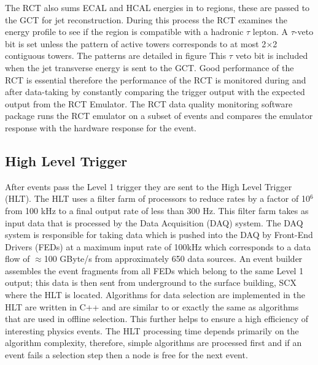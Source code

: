 The RCT also sums ECAL and HCAL energies in to regions, these are passed
to the GCT for jet reconstruction. During this process the RCT examines the
energy profile to see if the region is compatible with a hadronic $\tau$ lepton.
A $\tau$-veto bit is set unless the pattern of active towers corresponds to at
most 2$\times$2 contiguous towers. The patterns are detailed in figure %
This $\tau$ veto bit is included when the jet transverse energy is sent to the GCT.
Good performance of the RCT is essential therefore the performance of the RCT%
is monitored during and after data-taking by constantly comparing the trigger 
output with the expected output from the RCT Emulator. The RCT data quality monitoring 
software package runs the RCT emulator on a subset of events and compares
the emulator response with the hardware response for the event.

  \subsection{High Level Trigger}
After events pass the Level 1 trigger they are sent to the High Level Trigger (HLT). The
HLT uses a filter farm of processors to reduce rates by a factor of 10$^{6}$ from 
100 kHz to a final output rate of less than 300 Hz. This filter farm takes as input
data that is processed by the Data Acquisition (DAQ) system. The DAQ system is responsible
for taking data which is pushed into the DAQ by Front-End Drivers (FEDs) at a maximum input 
rate of 100kHz which corresponds to a data flow of $\approx$100 GByte/s from approximately
650 data sources. An event builder assembles the event fragments from all FEDs
which belong to the same Level 1 output; this data is then sent from underground to the surface %
building, SCX where the HLT is located.
Algorithms for data selection are implemented in the HLT are written in
C++ and are similar to or exactly the same as algorithms that are used in offline selection. This 
further helps to ensure a high efficiency of interesting physics events.
The HLT processing time depends primarily on the algorithm complexity,
therefore, simple algorithms are processed first and if an event fails a selection
step then a node is free for the next event.
